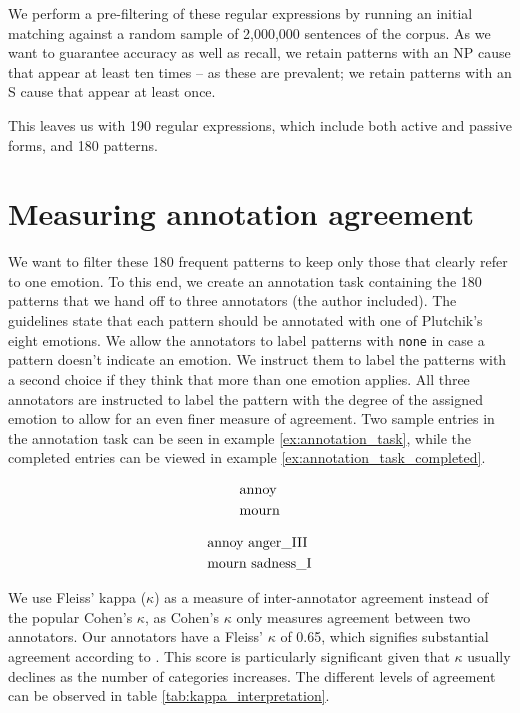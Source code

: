 We perform a pre-filtering of these regular expressions by running an initial matching against a random sample of 2,000,000 sentences of the corpus. As we want to guarantee accuracy as well as recall, we retain patterns with an NP cause that appear at least ten times -- as these are prevalent; we retain patterns with an S cause that appear at least once.

This leaves us with 190 regular expressions, which include both active and passive forms, and 180 patterns. 

\section{Measuring annotation agreement} \label{sec:agreement}

We want to filter these 180 frequent patterns to keep only those that clearly refer to one emotion. To this end, we create an annotation task containing the 180 patterns that we hand off to three annotators (the author included). The guidelines state that each pattern should be annotated with one of Plutchik's eight emotions. We allow the annotators to label patterns with \texttt{none} in case a pattern doesn't indicate an emotion. We instruct them to label the patterns with a second choice if they think that more than one emotion applies. All three annotators are instructed to label the pattern with the degree of the assigned emotion to allow for an even finer measure of agreement. Two sample entries in the annotation task can be seen in example \ref{ex:annotation_task}, while the completed entries can be viewed in example \ref{ex:annotation_task_completed}.

\begin{align}
\begin{split}\label{ex:annotation_task}
&\textnormal{annoy}\\
&\textnormal{mourn}
\end{split}
\end{align}

\begin{align}
\begin{split}\label{ex:annotation_task_completed}
&\textnormal{annoy	anger\_III}\\
&\textnormal{mourn	sadness\_I}
\end{split}
\end{align}

We use Fleiss' kappa ($\kappa$) as a measure of inter-annotator agreement instead of the popular Cohen's $\kappa$, as Cohen's $\kappa$ only measures agreement between two annotators. Our annotators have a Fleiss' $\kappa$ of 0.65, which signifies substantial agreement according to \citeauthor{kappa}. This score is particularly significant given that $\kappa$ usually declines as the number of categories increases. The different levels of agreement can be observed in table \ref{tab:kappa_interpretation}.

